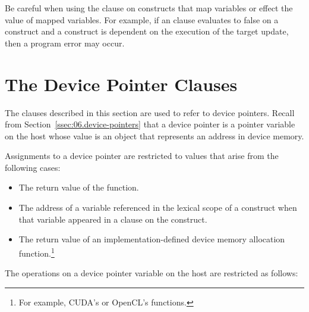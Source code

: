 Be careful when using the  clause on constructs that
map variables or effect the value of mapped variables.  
For example, if an  clause evaluates to false on a
 construct and a  construct is dependent on
the execution of the target update, then a program error may occur.

\section{The Device Pointer Clauses}
\label{sec:06.Device-pointer-clauses}

The clauses described in this section are used to refer to device pointers.
Recall from Section~\ref{ssec:06.device-pointers} that a device pointer is a
pointer variable on the host whose value is an object that represents an
address in device memory.

Assignments to a device pointer are restricted to values that arise
from the following cases:

\begin{itemize}

  \item The return value of the  function.

  \item The address of a variable referenced in the lexical scope of a
   construct when that variable appeared in a
   clause on the construct.

  \item The return value of an implementation-defined device memory allocation
  function.\footnote{For example, CUDA's \cite{CUDA-website} or OpenCL's
  \cite{OpenCL-website} functions.}


\end{itemize}

The operations on a device pointer variable on the host are restricted as
follows:


